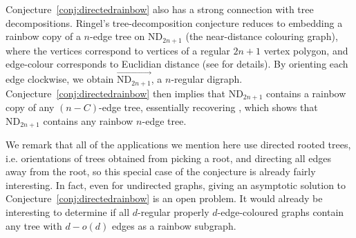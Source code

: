 \documentclass[a4paper,11pt,hidelinks]{amsart}
\theoremstyle{definition}
\begin{document}
\par Conjecture~\ref{conj:directedrainbow} also has a strong connection with tree decompositions. Ringel's tree-decomposition conjecture reduces to embedding a rainbow copy of a $n$-edge tree on $\mathrm{ND}_{2n+1}$ (the near-distance colouring graph), where the vertices correspond to vertices of a regular $2n+1$ vertex polygon, and edge-colour corresponds to Euclidian distance (see \cite{ringel} for details). By orienting each edge clockwise, we obtain $\vec{\mathrm{ND}_{2n+1}}$, a $n$-regular digraph. Conjecture~\ref{conj:directedrainbow} then implies that $\mathrm{ND}_{2n+1}$ contains a rainbow copy of any $(n-C)$-edge tree, essentially recovering \cite{ringel}, which shows that $\mathrm{ND}_{2n+1}$ contains any rainbow $n$-edge tree.
\par We remark that all of the applications we mention here use directed rooted trees, i.e. orientations of trees obtained from picking a root, and directing all edges away from the root, so this special case of the conjecture is already fairly interesting. In fact, even for undirected graphs, giving an asymptotic solution to Conjecture~\ref{conj:directedrainbow} is an open problem. It would already be interesting to determine if all $d$-regular properly $d$-edge-coloured graphs contain any tree with $d-o(d)$ edges as a rainbow subgraph.
\end{document}
